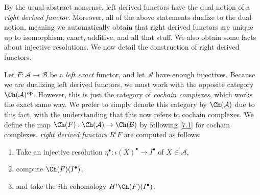 By the usual abstract nonsense, left derived functors have the dual notion of a \emph{right derived functor}. Moreover, all of the above statements dualize to the dual notion, meaning we automatically obtain that right derived functors are unique up to isomorphism, exact, additive, and all that stuff. We also obtain some facts about injective resolutions. We now detail the construction of right derived functors.

\begin{construction}\label{7.19}
	Let $F : \mathcal{A}  \to \mathcal{B} $ be a \emph{left exact} functor, and let $\mathcal{A} $ have enough injectives. Because we are dualizing left derived functors, we must work with the opposite category $\Ch(\mathcal{A} ) ^{\mathrm{op}} $. However, this is just the category of \emph{cochain complexes}, which works the exact same way. We prefer to simply denote this category by $\Ch(\mathcal{A} ) $ due to this fact, with the understanding that this now refers to cochain complexes. We define the map $\Ch(F) : \Ch(\mathcal{A} )  \to \Ch(\mathcal{B} ) $ by following \cref{7.1} for cochain complexes. \emph{right derived functors} $R^iF$ are computed as follows:
	\begin{enumerate}
		\item Take an injective resolution $\eta ^{\bullet} : \iota (X)^{\bullet}  \to I^{\bullet} $ of $X\in \mathcal{A} $,
		\item compute $\Ch(F) (I^{\bullet} )$,
		\item and take the $i$th cohomology $H^i \Ch(F) (I^{\bullet} )$.
	\end{enumerate}
\end{construction}

